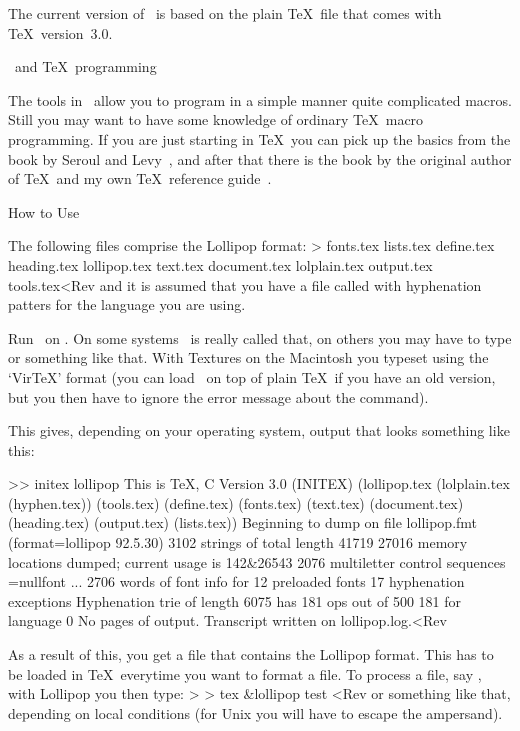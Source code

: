 The current version of \Lollipop\ is based on the plain \TeX\ file
that comes with \TeX\ version~3.0.

\SubSection \Lollipop\ and \TeX\ programming

The tools in \Lollipop\ allow you to program in a simple manner quite
complicated macros. Still you may want to have some knowledge of
ordinary \TeX\ macro programming. If you are just starting in \TeX\
you can pick up the basics from the book by Seroul and
Levy~, 
and after that there is the book by
the original author of \TeX~\bibref[Kn:book] and my own \TeX\
reference guide~\bibref[E:book].

 \Section How to Use \Lollipop

The following files comprise the Lollipop format:
\Ver>
    fonts.tex       lists.tex
    define.tex      heading.tex     lollipop.tex    text.tex
    document.tex    lolplain.tex    output.tex      tools.tex<Rev
and it is assumed that you have a file called  with
hyphenation patters for the language you are using.

Run \IniTeX\ on . On some systems \IniTeX\ is
really called that, on others you may have to type  or
something like that. With Textures on the Macintosh you typeset using
the `VirTeX' format (you can load \Lollipop\ on top of plain \TeX\
if you have an old version,
but you then have to ignore the error message about the \cs{patterns}
command).

 This gives, depending on your operating system, output that
looks something like this:

\Ver>> initex lollipop
This is TeX, C Version 3.0 (INITEX)
(lollipop.tex (lolplain.tex (hyphen.tex)) (tools.tex) (define.tex) (fonts.tex)
(text.tex) (document.tex) (heading.tex) (output.tex) (lists.tex))
Beginning to dump on file lollipop.fmt
 (format=lollipop 92.5.30)
3102 strings of total length 41719
27016 memory locations dumped; current usage is 142&26543
2076 multiletter control sequences
\font\nullfont=nullfont
...
2706 words of font info for 12 preloaded fonts
17 hyphenation exceptions
Hyphenation trie of length 6075 has 181 ops out of 500
  181 for language 0
No pages of output.
Transcript written on lollipop.log.<Rev

As a result of this, you get a file  that contains
the Lollipop format. This has to be loaded in \TeX\ everytime you want
to format a file. To process a file, say , with
Lollipop you then type:
\Ver>
> tex &lollipop test <Rev
or something like that, depending on local conditions (for Unix you
will have to escape the ampersand).

